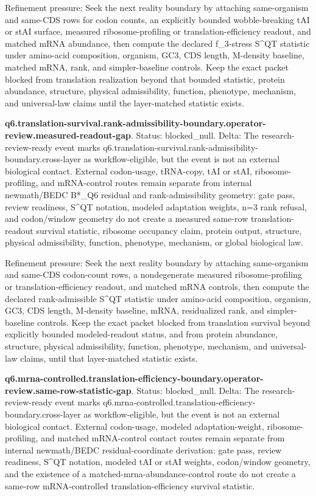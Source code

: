 Refinement pressure: Seek the next reality boundary by attaching same-organism and same-CDS rows for codon counts, an explicitly bounded wobble-breaking tAI or stAI surface, measured ribosome-profiling or translation-efficiency readout, and matched mRNA abundance, then compute the declared f\_3-stress S\textasciicircum{}QT statistic under amino-acid composition, organism, GC3, CDS length, M-density baseline, matched mRNA, rank, and simpler-baseline controls. Keep the exact packet blocked from translation realization beyond that bounded statistic, protein abundance, structure, physical admissibility, function, phenotype, mechanism, and universal-law claims until the layer-matched statistic exists.

\textbf{q6.translation-survival.rank-admissibility-boundary.operator-review.measured-readout-gap}. Status: blocked\_null. Delta: The research-review-ready event marks q6.translation-survival.rank-admissibility-boundary.cross-layer as workflow-eligible, but the event is not an external biological contact. External codon-usage, tRNA-copy, tAI or stAI, ribosome-profiling, and mRNA-control routes remain separate from internal newmath/BEDC B*\_Q6 residual and rank-admissibility geometry: gate pass, review readiness, S\textasciicircum{}QT notation, modeled adaptation weights, n=3 rank refusal, and codon/window geometry do not create a measured same-row translation-readout survival statistic, ribosome occupancy claim, protein output, structure, physical admissibility, function, phenotype, mechanism, or global biological law.

Refinement pressure: Seek the next reality boundary by attaching same-organism and same-CDS codon-count rows, a nondegenerate measured ribosome-profiling or translation-efficiency readout, and matched mRNA controls, then compute the declared rank-admissible S\textasciicircum{}QT statistic under amino-acid composition, organism, GC3, CDS length, M-density baseline, mRNA, residualized rank, and simpler-baseline controls. Keep the exact packet blocked from translation survival beyond explicitly bounded modeled-readout status, and from protein abundance, structure, physical admissibility, function, phenotype, mechanism, and universal-law claims, until that layer-matched statistic exists.

\textbf{q6.mrna-controlled.translation-efficiency-boundary.operator-review.same-row-statistic-gap}. Status: blocked\_null. Delta: The research-review-ready event marks q6.mrna-controlled.translation-efficiency-boundary.cross-layer as workflow-eligible, but the event is not an external biological contact. External codon-usage, modeled adaptation-weight, ribosome-profiling, and matched mRNA-control contact routes remain separate from internal newmath/BEDC residual-coordinate derivation: gate pass, review readiness, S\textasciicircum{}QT notation, modeled tAI or stAI weights, codon/window geometry, and the existence of a matched-mrna-abundance-control route do not create a same-row mRNA-controlled translation-efficiency survival statistic.

